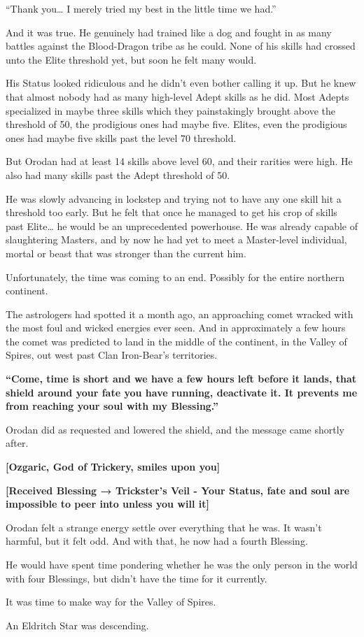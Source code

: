\documentclass[a4paper,10pt]{book}
\begin{document}
“Thank you… I merely tried my best in the little time we had.”\par
And it was true. He genuinely had trained like a dog and fought in as many battles against the Blood-Dragon tribe as he could. None of his skills had crossed unto the Elite threshold yet, but soon he felt many would.\par
His Status looked ridiculous and he didn’t even bother calling it up. But he knew that almost nobody had as many high-level Adept skills as he did. Most Adepts specialized in maybe three skills which they painstakingly brought above the threshold of 50, the prodigious ones had maybe five. Elites, even the prodigious ones had maybe five skills past the level 70 threshold.\par
But Orodan had at least 14 skills above level 60, and their rarities were high. He also had many skills past the Adept threshold of 50.\par
He was slowly advancing in lockstep and trying not to have any one skill hit a threshold too early. But he felt that once he managed to get his crop of skills past Elite… he would be an unprecedented powerhouse. He was already capable of slaughtering Masters, and by now he had yet to meet a Master-level individual, mortal or beast that was stronger than the current him.\par
Unfortunately, the time was coming to an end. Possibly for the entire northern continent.\par
The astrologers had spotted it a month ago, an approaching comet wracked with the most foul and wicked energies ever seen. And in approximately a few hours the comet was predicted to land in the middle of the continent, in the Valley of Spires, out west past Clan Iron-Bear’s territories.\par
\textbf{“Come, time is short and we have a few hours left before it lands, that shield around your fate you have running, deactivate it. It prevents me from reaching your soul with my Blessing.”}\par
Orodan did as requested and lowered the shield, and the message came shortly after.\par
\textbf{[Ozgaric, God of Trickery, smiles upon you]}\par
\textbf{[Received Blessing → Trickster’s Veil - Your Status, fate and soul are impossible to peer into unless you will it]}\par
Orodan felt a strange energy settle over everything that he was. It wasn’t harmful, but it felt odd. And with that, he now had a fourth Blessing.\par
He would have spent time pondering whether he was the only person in the world with four Blessings, but didn’t have the time for it currently.\par
It was time to make way for the Valley of Spires.\par
An Eldritch Star was descending.\par
\end{document}
